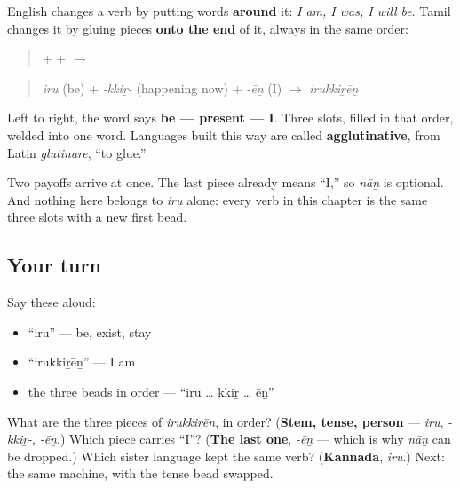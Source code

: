 \begin{grammarlens}[title={Grammar Lens: stem, then tense, then person}]
English changes a verb by putting words \textbf{around} it: \emph{I am, I was, I will be}. Tamil changes it by gluing pieces \textbf{onto the end} of it, always in the same order:

\begin{quote}
\textbf{} + \textbf{} + \textbf{} $\to$ \textbf{}
\end{quote}

\begin{quote}
\emph{iru} (be) + \emph{-kkiṟ-} (happening now) + \emph{-ēṉ} (I) $\to$ \emph{irukkiṟēṉ}
\end{quote}

Left to right, the word says \textbf{be — present — I}. Three slots, filled in that order, welded into one word. Languages built this way are called \textbf{agglutinative}, from Latin \emph{glutinare}, \textquotedblleft{}to glue.\textquotedblright{}

Two payoffs arrive at once. The last piece already means \textquotedblleft{}I,\textquotedblright{} so \emph{nāṉ} is optional. And nothing here belongs to \emph{iru} alone: every verb in this chapter is the same three slots with a new first bead.
\end{grammarlens}

\subsection*{Your turn}
Say these aloud:

\begin{itemize}
\raggedright
  \item \textquotedblleft{}iru\textquotedblright{} — be, exist, stay
  \item \textquotedblleft{}irukkiṟēṉ\textquotedblright{} — I am
  \item the three beads in order — \textquotedblleft{}iru … kkiṟ … ēṉ\textquotedblright{}
\end{itemize}

\begin{tcolorbox}[breakable,colback=teal!4,colframe=teal!35!black,title={Before you move on}]
What are the three pieces of \emph{irukkiṟēṉ}, in order? (\textbf{Stem, tense, person} — \emph{iru}, \emph{-kkiṟ-}, \emph{-ēṉ}.) Which piece carries \textquotedblleft{}I\textquotedblright{}? (\textbf{The last one}, \emph{-ēṉ} — which is why \emph{nāṉ} can be dropped.) Which sister language kept the same verb? (\textbf{Kannada}, \emph{iru}.) Next: the same machine, with the tense bead swapped.
\end{tcolorbox}
